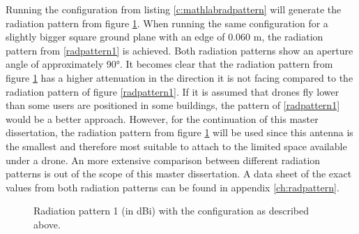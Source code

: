 Running the configuration from listing \ref{c:mathlabradpattern} will generate the radiation pattern from figure \ref{radpattern2}.
When running the same configuration for a slightly bigger square ground plane with an edge of 0.060 m, the radiation pattern from \ref{radpattern1} is
achieved. Both radiation patterns show an aperture angle of approximately 90°. It becomes clear that the radiation pattern from figure \ref{radpattern2} has a higher attenuation in the direction it is not facing compared to
the radiation pattern of figure \ref{radpattern1}. If it is assumed that drones fly lower than some users are positioned in some buildings, the pattern of 
\ref{radpattern1} would be a better approach. 
However, for the continuation of this master dissertation, the radiation pattern from figure \ref{radpattern2} 
will be used since this antenna is the smallest
and therefore most suitable to attach to the limited space available under a drone. 
An more extensive comparison between different radiation patterns is out of the scope of this master dissertation. 
A data sheet of the exact values from both radiation patterns can be
found in appendix \ref{ch:radpattern}.


\begin{figure}[!htb]
\caption{Radiation pattern 1 (in dBi) with the configuration as described above.}
  \label{radpattern2}
\end{figure}


